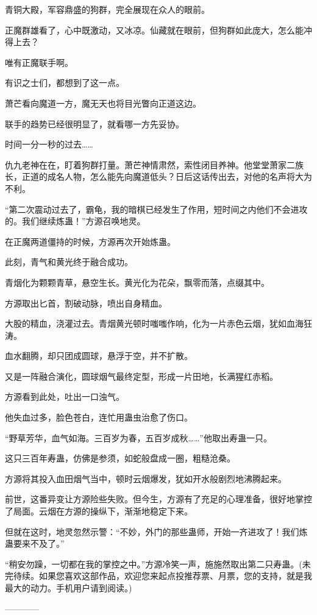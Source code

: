 \begin{this_body}
青铜大殿，军容鼎盛的狗群，完全展现在众人的眼前。

正魔群雄看了，心中既激动，又冰凉。仙藏就在眼前，但狗群如此庞大，怎么能冲得上去？

唯有正魔联手啊。

有识之士们，都想到了这一点。

萧芒看向魔道一方，魔无天也将目光瞥向正道这边。

联手的趋势已经很明显了，就看哪一方先妥协。

时间一分一秒的过去……

仇九老神在在，盯着狗群打量。萧芒神情肃然，索性闭目养神。他堂堂萧家二族长，正道的成名人物，怎么能先向魔道低头？日后这话传出去，对他的名声将大为不利。

“第二次震动过去了，霸龟，我的暗棋已经发生了作用，短时间之内他们不会进攻的。我们继续炼蛊！”方源召唤地灵。

在正魔两道僵持的时候，方源再次开始炼蛊。

此刻，青气和黄光终于融合成功。

青烟化为颗颗青草，悬空生长。黄光化为花朵，飘零而落，点缀其中。

方源取出匕首，割破动脉，喷出自身精血。

大股的精血，浇灌过去。青烟黄光顿时嗤嗤作响，化为一片赤色云烟，犹如血海狂涛。

血水翻腾，却只团成圆球，悬浮于空，并不扩散。

又是一阵融合演化，圆球烟气最终定型，形成一片田地，长满猩红赤稻。

方源看到此处，吐出一口浊气。

他失血过多，脸色苍白，连忙用蛊虫治愈了伤口。

“野草芳华，血气如海。三百岁为春，五百岁成秋……”他取出寿蛊一只。

这只三百年寿蛊，仿佛是参须，如蛇般盘成一圈，粗糙沧桑。

方源将其投入血田烟气当中，顿时云烟爆发，犹如开水般剧烈地沸腾起来。

前世，这番异变让方源险些失败。但今生，方源有了充足的心理准备，很好地掌控了局面。云烟在方源的操纵下，渐渐地稳定下来。

但就在这时，地灵忽然示警：“不妙，外门的那些蛊师，开始一齐进攻了！我们炼蛊要来不及了。”

“稍安勿躁，一切都在我的掌控之中。”方源冷笑一声，施施然取出第二只寿蛊。(未完待续。如果您喜欢这部作品，欢迎您来起点投推荐票、月票，您的支持，就是我最大的动力。手机用户请到阅读。)

------------

\end{this_body}

